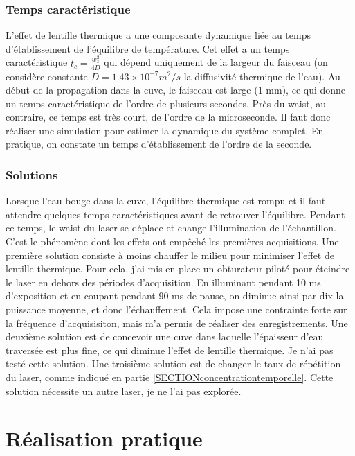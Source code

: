 \subsubsection{Temps caractéristique}

L'effet de lentille thermique a une composante dynamique liée au temps d'établissement de l'équilibre de température. Cet effet a un temps caractéristique $t_c = \frac{w_z^2}{4D}$ qui dépend uniquement de la largeur du faisceau (on considère constante $D = 1.43\times 10^{-7} m^2/s$ la diffusivité thermique de l'eau). Au début de la propagation dans la cuve, le faisceau est large (1 mm), ce qui donne un temps caractéristique de l'ordre de plusieurs secondes. Près du waist, au contraire, ce temps est très court, de l'ordre de la microseconde. Il faut donc réaliser une simulation pour estimer la dynamique du système complet. 
En pratique, on constate un temps d'établissement de l'ordre de la seconde.

\subsubsection{Solutions}

Lorsque l'eau bouge dans la cuve, l'équilibre thermique est rompu et il faut attendre quelques temps caractéristiques avant de retrouver l'équilibre. Pendant ce temps, le waist du laser se déplace et change l'illumination de l'échantillon. C'est le phénomène dont les effets ont empêché les premières acquisitions. Une première solution consiste à moins chauffer le milieu pour minimiser l'effet de lentille thermique. Pour cela, j'ai mis en place un obturateur piloté pour éteindre le laser en dehors des périodes d'acquisition. En illuminant pendant 10 ms d'exposition et en coupant pendant 90 ms de pause, on diminue ainsi par dix la puissance moyenne, et donc l'échauffement. Cela impose une contrainte forte sur la fréquence d'acquisisiton, mais m'a permis de réaliser des enregistrements.
Une deuxième solution est de concevoir une cuve dans laquelle l'épaisseur d'eau traversée est plus fine, ce qui diminue l'effet de lentille thermique. Je n'ai pas testé cette solution.
Une troisième solution est de changer le taux de répétition du laser, comme indiqué en partie \ref{SECTIONconcentrationtemporelle}. Cette solution nécessite un autre laser, je ne l'ai pas explorée.

\section{Réalisation pratique}




